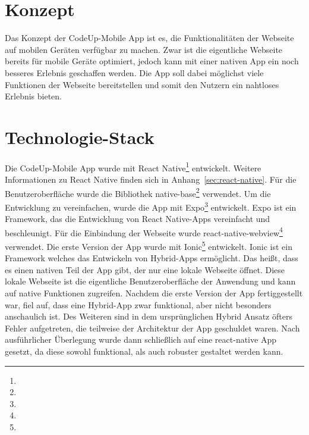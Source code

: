 \documentclass[main.tex]{subfiles}
\begin{document}
    \section{Konzept}
    Das Konzept der CodeUp-Mobile App ist es, die Funktionalitäten der Webseite auf mobilen Geräten verfügbar zu machen.
    Zwar ist die eigentliche Webseite bereits für mobile Geräte optimiert, jedoch kann mit einer nativen App ein noch besseres Erlebnis geschaffen werden.
    Die App soll dabei möglichst viele Funktionen der Webseite bereitstellen und somit den Nutzern ein nahtloses Erlebnis bieten.
    \section{Technologie-Stack}
    Die CodeUp-Mobile App wurde mit React Native\footnote{} entwickelt.
    Weitere Informationen zu React Native finden sich in Anhang~\ref{sec:react-native}.
    Für die Benutzeroberfläche wurde die Bibliothek native-base\footnote{} verwendet.
    Um die Entwicklung zu vereinfachen, wurde die App mit Expo\footnote{} entwickelt.
    Expo ist ein Framework, das die Entwicklung von React Native-Apps vereinfacht und beschleunigt.
    Für die Einbindung der Webseite wurde react-native-webview\footnote{} verwendet.
    Die erste Version der App wurde mit Ionic\footnote{} entwickelt.
    Ionic ist ein Framework welches das Entwickeln von Hybrid-Apps ermöglicht.
    Das heißt, dass es einen nativen Teil der App gibt, der nur eine lokale Webseite öffnet.
    Diese lokale Webseite ist die eigentliche Benutzeroberfläche der Anwendung und kann auf native Funktionen zugreifen.
    Nachdem die erste Version der App fertiggestellt war, fiel auf, dass eine Hybrid-App zwar funktional, aber nicht besonders anschaulich ist.
    Des Weiteren sind in dem ursprünglichen Hybrid Ansatz öfters Fehler aufgetreten, die teilweise der Architektur der App geschuldet waren.
    Nach ausführlicher Überlegung wurde dann schließlich auf eine react-native App gesetzt, da diese sowohl funktional, als auch robuster gestaltet werden kann.
\end{document}
